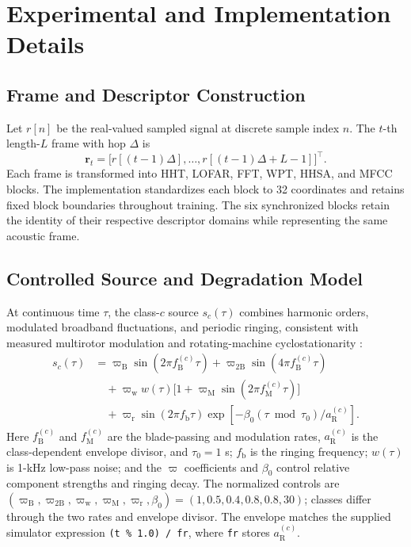 \section{Experimental and Implementation Details}
\label{app:experimental-details}

\subsection{Frame and Descriptor Construction}
Let $r[n]$ be the real-valued sampled signal at discrete sample index $n$. The $t$-th length-$L$ frame with hop $\Delta$ is
\begin{equation}
\mathbf r_t=
\big[r[(t-1)\Delta],\ldots,r[(t-1)\Delta+L-1]\big]^\top.
\end{equation}
Each frame is transformed into HHT, LOFAR, FFT, WPT, HHSA, and MFCC blocks. The implementation standardizes each block to 32 coordinates and retains fixed block boundaries throughout training. The six synchronized blocks retain the identity of their respective descriptor domains while representing the same acoustic frame.

\subsection{Controlled Source and Degradation Model}
At continuous time $\tau$, the class-$c$ source $s_c(\tau)$ combines harmonic orders, modulated broadband fluctuations, and periodic ringing, consistent with measured multirotor modulation \citep{fang2022uav,gan2025modulation} and rotating-machine cyclostationarity \citep{antoni2009cyclostationarity}:
\begin{align}
s_c(\tau) &= \varpi_{\mathrm B}\sin(2\pi f_{\mathrm B}^{(c)}\tau)
 +\varpi_{2\mathrm B}\sin(4\pi f_{\mathrm B}^{(c)}\tau) \nonumber\\
&\quad +\varpi_{\mathrm w}w(\tau)
\bigl[1+\varpi_{\mathrm M}\sin(2\pi f_{\mathrm M}^{(c)}\tau)\bigr] \nonumber\\
&\quad +\varpi_{\mathrm r}\sin(2\pi f_{\mathrm b}\tau)
\exp[-\beta_0(\tau\bmod\tau_0)/a_{\mathrm R}^{(c)}].
\label{eq:source-signal-app}
\end{align}
Here $f_{\mathrm B}^{(c)}$ and $f_{\mathrm M}^{(c)}$ are the blade-passing and modulation rates, $a_{\mathrm R}^{(c)}$ is the class-dependent envelope divisor, and $\tau_0=1$ s; $f_{\mathrm b}$ is the ringing frequency; $w(\tau)$ is 1-kHz low-pass noise; and the $\varpi$ coefficients and $\beta_0$ control relative component strengths and ringing decay. The normalized controls are
$(\varpi_{\mathrm B},\varpi_{2\mathrm B},\varpi_{\mathrm w},\varpi_{\mathrm M},\varpi_{\mathrm r},\beta_0)=(1,0.5,0.4,0.8,0.8,30)$; classes differ through the two rates and envelope divisor. The envelope matches the supplied simulator expression \texttt{(t \% 1.0) / fr}, where \texttt{fr} stores $a_{\mathrm R}^{(c)}$.

